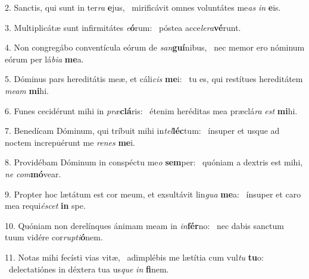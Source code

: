 2. Sanctis, qui sunt in ter\textit{ra} \textbf{e}jus, \ast\  mirificávit omnes voluntátes me\textit{as} \textit{in} \textbf{e}is.\

3. Multiplicátæ sunt infirmitátes \textit{e}\textbf{ó}rum: \ast\  póstea acce\textit{le}\textit{ra}\textbf{vé}runt.\

4. Non congregábo conventícula eórum de \textit{san}\textbf{guí}nibus, \ast\  nec memor ero nóminum eórum per lá\textit{bi}\textit{a} \textbf{me}a.\

5. Dóminus pars hereditátis meæ, et cáli\textit{cis} \textbf{me}i: \ast\  tu es, qui restítues hereditátem \textit{me}\textit{am} \textbf{mi}hi.\

6. Funes cecidérunt mihi in \textit{præ}\textbf{clá}ris: \ast\  étenim heréditas mea præclá\textit{ra} \textit{est} \textbf{mi}hi.\

7. Benedícam Dóminum, qui tríbuit mihi in\textit{tel}\textbf{léc}tum: \ast\  ínsuper et usque ad noctem increpuérunt me \textit{re}\textit{nes} \textbf{me}i.\

8. Providébam Dóminum in conspéctu me\textit{o} \textbf{sem}per: \ast\  quóniam a dextris est mihi, \textit{ne} \textit{com}\textbf{mó}vear.\

9. Propter hoc lætátum est cor meum, et exsultávit lin\textit{gua} \textbf{me}a: \ast\  ínsuper et caro mea requi\textit{é}\textit{scet} \textbf{in} spe.\

10. Quóniam non derelínques ánimam meam in \textit{in}\textbf{fér}no: \ast\  nec dabis sanctum tuum vidére cor\textit{rup}\textit{ti}\textbf{ó}nem.\

11. Notas mihi fecísti vias vitæ, \dag\  adimplébis me lætítia cum vul\textit{tu} \textbf{tu}o: \ast\  delectatiónes in déxtera tua us\textit{que} \textit{in} \textbf{fi}nem.\

